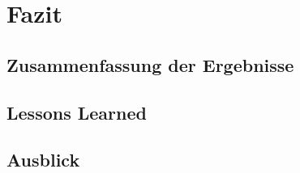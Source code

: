 \newpage
\section{Fazit}

\subsection{Zusammenfassung der Ergebnisse} 

\subsection{Lessons Learned}

\subsection{Ausblick}
